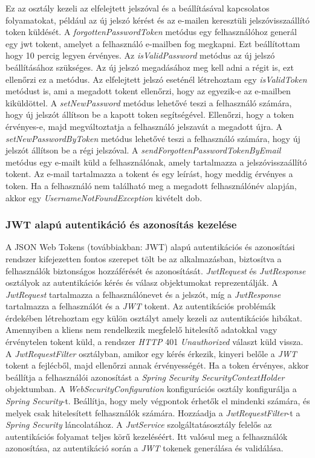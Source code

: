 Ez az osztály kezeli az elfelejtett jelszóval és a beállításával kapcsolatos folyamatokat, például az új jelszó kérést és az e-mailen keresztüli jelszóvisszaállító token küldését. A \textit{forgottenPasswordToken} metódus egy felhasználóhoz generál egy jwt tokent, amelyet a felhasználó e-mailben fog megkapni. Ezt beállítottam hogy 10 percig legyen érvényes. Az \textit{isValidPassword} metódus az új jelszó beállításához szükséges. Az új jelszó megadásához meg kell adni a régit is, ezt ellenőrzi ez a metódus. Az elfelejtett jelszó eseténél létrehoztam egy \textit{isValidToken} metódust is, ami a megadott tokent ellenőrzi, hogy az egyezik-e az e-mailben kiküldöttel. A \textit{setNewPassword} metódus lehetővé teszi a felhasználó számára, hogy új jelszót állítson be a kapott token segítségével. Ellenőrzi, hogy a token érvényes-e, majd megváltoztatja a felhasználó jelszavát a megadott újra. A \textit{setNewPasswordByToken} metódus lehetővé teszi a felhasználó számára, hogy új jelszót állítson be a régi jelszóval. A \textit{sendForgottenPasswordTokenByEmail} metódus egy e-mailt küld a felhasználónak, amely tartalmazza a jelszóvisszaállító tokent. Az e-mail tartalmazza a tokent és egy leírást, hogy meddig érvényes a token. Ha a felhasználó nem található meg a megadott felhasználónév alapján, akkor egy \textit{UsernameNotFoundException} kivételt dob.

\subsubsection{JWT alapú autentikáció és azonosítás kezelése}

A JSON Web Tokens (továbbiakban: JWT) \cite{JSON Web Tokens} alapú autentikációs és azonosítási rendszer kifejezetten fontos szerepet tölt be az alkalmazásban, biztosítva a felhasználók biztonságos hozzáférését és azonosítását. \textit{JwtRequest} és \textit{JwtResponse} osztályok az autentikációs kérés és válasz objektumokat reprezentálják. A \textit{JwtRequest} tartalmazza a felhasználónevet és a jelszót, míg a \textit{JwtResponse} tartalmazza a felhasználót és a \textit{JWT} tokent. Az autentikációs problémák érdekében létrehoztam egy külön osztályt amely kezeli az autentikációs hibákat. Amennyiben a kliens nem rendelkezik megfelelő hitelesítő adatokkal vagy érvénytelen tokent küld, a rendszer \textit{HTTP} 401 \textit{Unauthorized} választ küld vissza. A \textit{JwtRequestFilter} osztályban, amikor egy kérés érkezik, kinyeri belőle a \textit{JWT} tokent a fejlécből, majd ellenőrzi annak érvényességét. Ha a token érvényes, akkor beállítja a felhasználói azonosítást a \textit{Spring Security SecurityContextHolder} objektumban. A \textit{WebSecurityConfiguration} konfigurációs osztály konfigurálja a \textit{Spring Security}-t. Beállítja, hogy mely végpontok érhetők el mindenki számára, és melyek csak hitelesített felhasználók számára. Hozzáadja a \textit{JwtRequestFilter}-t a \textit{Spring Security} láncolatához. A \textit{JwtService} szolgáltatásosztály felelős az autentikációs folyamat teljes körű kezeléséért. Itt valósul meg a felhasználók azonosítása, az autentikáció során a \textit{JWT} tokenek generálása és validálása. 


